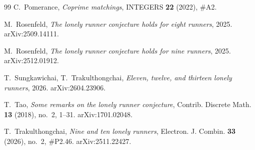 \documentclass[11pt]{amsart}
\theoremstyle{plain}
\theoremstyle{definition}
\begin{document}
\begin{thebibliography}{99}
 C.~Pomerance, \emph{Coprime matchings}, INTEGERS \textbf{22} (2022), \#A2.

 M.~Rosenfeld, \emph{The lonely runner conjecture holds for eight runners}, 2025.
arXiv:2509.14111.

 M.~Rosenfeld, \emph{The lonely runner conjecture holds for nine runners}, 2025.
arXiv:2512.01912.

 T.~Sungkawichai, T.~Trakulthongchai, \emph{Eleven, twelve, and thirteen lonely
runners}, 2026. arXiv:2604.23906.

 T.~Tao, \emph{Some remarks on the lonely runner conjecture}, Contrib. Discrete Math.
\textbf{13} (2018), no.~2, 1--31. arXiv:1701.02048.

 T.~Trakulthongchai, \emph{Nine and ten lonely runners}, Electron. J. Combin.
\textbf{33} (2026), no.~2, \#P2.46. arXiv:2511.22427.

\end{thebibliography}
\end{document}
